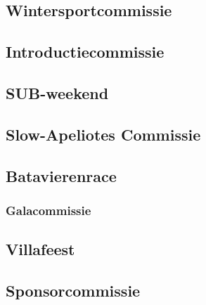 \documentclass[]{article}
\begin{document}
\subsection{Wintersportcommissie}

\subsection{Introductiecommissie}

\subsection{SUB-weekend}

\subsection{Slow-Apeliotes Commissie}

\subsection{Batavierenrace}

\subsubsection{Galacommissie}

\subsection{Villafeest}

\subsection{Sponsorcommissie}
\end{document}
